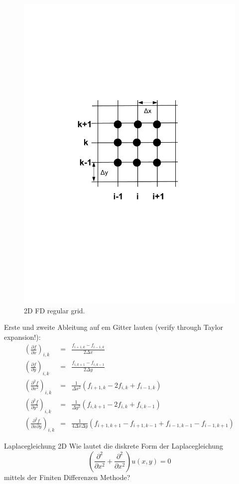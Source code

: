 \begin{figure}[!ht]
        \begin{center}
	        \includegraphics[width=.7\textwidth]{fig/GridFD2D.pdf}
        	\caption{2D FD regular grid.\label{fig:gridfd2d}}
        \end{center}
\end{figure}

Erste und zweite Ableitung auf em Gitter lauten (verify through Taylor expansion!):
\begin{eqnarray*}
	\left(\frac{\partial f}{\partial x}\right)_{i,k}&=&\frac{f_{i+1,k}-f_{i-1,k}}{2\Delta x}\\
	\left(\frac{\partial f}{\partial y}\right)_{i,k}&=&\frac{f_{i,k+1}-f_{i,k-1}}{2\Delta y}\\
	\left(\frac{\partial^2 f}{\partial x^2}\right)_{i,k}&=&\frac{1}{\Delta
	     x^2}(f_{i+1,k}-2f_{i,k}+f_{i-1,k})\\
	\left(\frac{\partial^2 f}{\partial y^2}\right)_{i,k}&=&\frac{1}{\Delta
	     y^2}(f_{i,k+1}-2f_{i,k}+f_{i,k-1})\\
	\left(\frac{\partial^2 f}{\partial x\partial y}\right)_{i,k}&=&\frac{1}{4\Delta x\Delta
	     y}(f_{i+1,k+1}-f_{i+1,k-1}+f_{i-1,k-1}-f_{i-1,k+1})
\end{eqnarray*}
\begin{example}{Laplacegleichung 2D}
Wie lautet die diskrete Form der Laplacegleichung
\[
\left(
\frac{\partial^2}{\partial x^2}+\frac{\partial^2}{\partial x^2}
\right)u(x,y)=0
\]
mittels der Finiten Differenzen Methode?
\end{example}